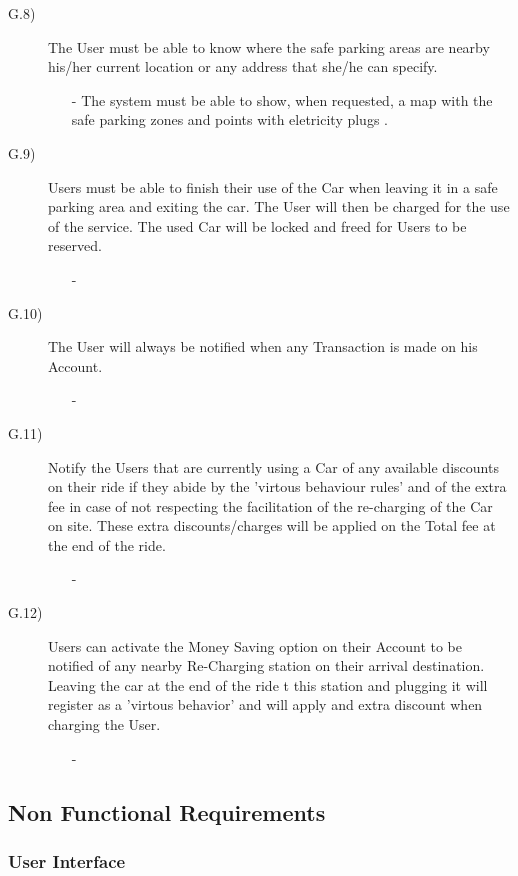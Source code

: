\documentclass[a4paper]{article}
\begin{document}
\begin{description}
\item [G.8)]The User must be able to know where the safe parking areas are nearby his/her current location or any address that she/he can specify.
\begin{itemize}
	\item[-]The system must be able to show, when requested, a map with the safe parking zones and points with eletricity plugs .
\end{itemize}
\item [G.9)]Users must be able to finish their use of the Car when leaving it in a safe parking area and exiting the car. The User will then be charged for the use of the service. The used Car will be locked and freed for Users to be reserved.
\begin{itemize}
	\item[-]
\end{itemize}
\item [G.10)]The User will always be notified when any Transaction is made on his Account.
\begin{itemize}
	\item[-]
\end{itemize}
\item [G.11)]Notify the Users that are currently using a Car of any available discounts on their ride if they abide by the 'virtous behaviour rules' and of the extra fee in case of not respecting the facilitation of the re-charging of the Car on site. These extra discounts/charges will be applied on the Total fee at the end of the ride.
\begin{itemize}
	\item[-]
\end{itemize}
\item [G.12)]Users can activate the Money Saving option on their Account to be notified of any nearby Re-Charging station on their arrival destination. Leaving the car at the end of the ride t this station and plugging it will register as a 'virtous behavior' and will apply and extra discount when charging the User.
\begin{itemize}
	\item[-]
\end{itemize}
\end{description}

\subsection{Non Functional Requirements}
\subsubsection{User Interface}
\end{document}
